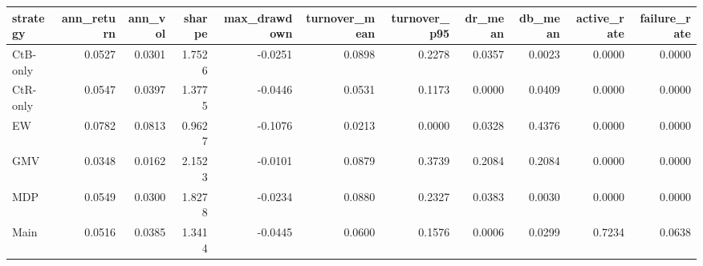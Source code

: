 \begin{tabular}{lrrrrrrrrrr}
\toprule
strategy & ann_return & ann_vol & sharpe & max_drawdown & turnover_mean & turnover_p95 & dr_mean & db_mean & active_rate & failure_rate \\
\midrule
CtB-only & 0.0527 & 0.0301 & 1.7526 & -0.0251 & 0.0898 & 0.2278 & 0.0357 & 0.0023 & 0.0000 & 0.0000 \\
CtR-only & 0.0547 & 0.0397 & 1.3775 & -0.0446 & 0.0531 & 0.1173 & 0.0000 & 0.0409 & 0.0000 & 0.0000 \\
EW & 0.0782 & 0.0813 & 0.9627 & -0.1076 & 0.0213 & 0.0000 & 0.0328 & 0.4376 & 0.0000 & 0.0000 \\
GMV & 0.0348 & 0.0162 & 2.1523 & -0.0101 & 0.0879 & 0.3739 & 0.2084 & 0.2084 & 0.0000 & 0.0000 \\
MDP & 0.0549 & 0.0300 & 1.8278 & -0.0234 & 0.0880 & 0.2327 & 0.0383 & 0.0030 & 0.0000 & 0.0000 \\
Main & 0.0516 & 0.0385 & 1.3414 & -0.0445 & 0.0600 & 0.1576 & 0.0006 & 0.0299 & 0.7234 & 0.0638 \\
\bottomrule
\end{tabular}
